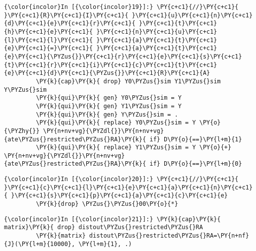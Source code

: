 \documentclass[11pt,notitlepage]{article}\usepackage[]{graphicx}\usepackage[]{color}
\makeatletter
\newenvironment{kframe}{%
 \def\at@end@of@kframe{}%
 \ifinner\ifhmode%
  \def\at@end@of@kframe{\end{minipage}}%
  \begin{minipage}{\columnwidth}%
 \fi\fi%
 \def\FrameCommand##1{\hskip\@totalleftmargin \hskip-\fboxsep
 \colorbox{shadecolor}{##1}\hskip-\fboxsep
     \hskip-\linewidth \hskip-\@totalleftmargin \hskip\columnwidth}%
 \MakeFramed {\advance\hsize-\width
   \@totalleftmargin\z@ \linewidth\hsize
   \@setminipage}}%
 {\par\unskip\endMakeFramed%
 \at@end@of@kframe}
\newenvironment{knitrout}{}{} %
\makeatother
\begin{document}
\begin{enumerate}[a)]
\begin{knitrout}
\begin{kframe}
    \begin{Verbatim}[commandchars=\\\{\}]
{\color{incolor}In [{\color{incolor}19}]:} \PY{c+c1}{//}\PY{c+c1}{ }\PY{c+c1}{R}\PY{c+c1}{I}\PY{c+c1}{ }\PY{c+c1}{u}\PY{c+c1}{n}\PY{c+c1}{d}\PY{c+c1}{e}\PY{c+c1}{r}\PY{c+c1}{ }\PY{c+c1}{t}\PY{c+c1}{h}\PY{c+c1}{e}\PY{c+c1}{ }\PY{c+c1}{n}\PY{c+c1}{u}\PY{c+c1}{l}\PY{c+c1}{l}\PY{c+c1}{ }\PY{c+c1}{a}\PY{c+c1}{t}\PY{c+c1}{e}\PY{c+c1}{=}\PY{c+c1}{ }\PY{c+c1}{a}\PY{c+c1}{t}\PY{c+c1}{e}\PY{c+c1}{\PYZus{}}\PY{c+c1}{r}\PY{c+c1}{e}\PY{c+c1}{s}\PY{c+c1}{t}\PY{c+c1}{r}\PY{c+c1}{i}\PY{c+c1}{c}\PY{c+c1}{t}\PY{c+c1}{e}\PY{c+c1}{d}\PY{c+c1}{\PYZus{}}\PY{c+c1}{R}\PY{c+c1}{A}
         \PY{k}{cap}\PY{k}{ drop} Y0\PYZus{}sim Y1\PYZus{}sim Y\PYZus{}sim
         \PY{k}{qui}\PY{k}{ gen} Y0\PYZus{}sim = Y
         \PY{k}{qui}\PY{k}{ gen} Y1\PYZus{}sim = Y
         \PY{k}{qui}\PY{k}{ gen} Y\PYZus{}sim = .
         \PY{k}{qui}\PY{k}{ replace} Y0\PYZus{}sim = Y \PY{o}{\PYZhy{}} \PY{n+nv+vg}{\PYZdl{}}\PY{n+nv+vg}{ate\PYZus{}restricted\PYZus{}RA}\PY{k}{ if} D\PY{o}{==}\PY{l+m}{1}
         \PY{k}{qui}\PY{k}{ replace} Y1\PYZus{}sim = Y \PY{o}{+} \PY{n+nv+vg}{\PYZdl{}}\PY{n+nv+vg}{ate\PYZus{}restricted\PYZus{}RA}\PY{k}{ if} D\PY{o}{==}\PY{l+m}{0}
\end{Verbatim}

    \begin{Verbatim}[commandchars=\\\{\}]
{\color{incolor}In [{\color{incolor}20}]:} \PY{c+c1}{//}\PY{c+c1}{ }\PY{c+c1}{c}\PY{c+c1}{l}\PY{c+c1}{e}\PY{c+c1}{a}\PY{c+c1}{n}\PY{c+c1}{ }\PY{c+c1}{s}\PY{c+c1}{p}\PY{c+c1}{a}\PY{c+c1}{c}\PY{c+c1}{e}
         \PY{k}{drop} \PYZus{}\PYZus{}00\PY{o}{*}
\end{Verbatim}

    \begin{Verbatim}[commandchars=\\\{\}]
{\color{incolor}In [{\color{incolor}21}]:} \PY{k}{cap}\PY{k}{ matrix}\PY{k}{ drop} distout\PYZus{}restricted\PYZus{}RA
         \PY{k}{matrix} distout\PYZus{}restricted\PYZus{}RA=\PY{n+nf}{J}(\PY{l+m}{10000}, \PY{l+m}{1}, .)
         

\end{Verbatim}
\end{kframe}
\end{knitrout}
\end{enumerate}
\end{document}
